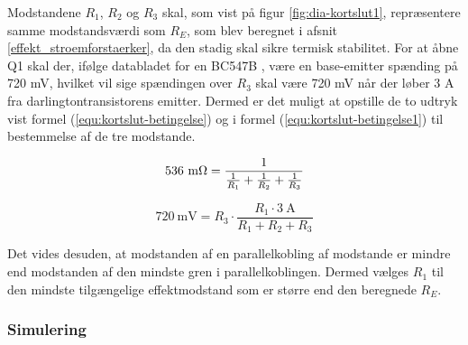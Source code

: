 Modstandene $R_1$, $R_2$ og $R_3$ skal, som vist på figur \ref{fig:dia-kortslut1}, repræsentere samme modstandsværdi som $R_E$, som blev beregnet i afsnit \ref{effekt_stroemforstaerker}, da den stadig skal sikre termisk stabilitet. For at åbne Q1 skal der, ifølge databladet for en BC547B , være en base-emitter spænding på 720 mV, hvilket vil sige spændingen over $R_3$ skal være 720 mV når der løber 3 A fra darlingtontransistorens emitter. Dermed er det muligt at opstille de to udtryk vist formel (\ref{equ:kortslut-betingelse}) og i formel (\ref{equ:kortslut-betingelse1}) til bestemmelse af de tre modstande.

\begin{equation}
\label{equ:kortslut-betingelse}
\mathrm{536~m\ohm} = \frac{1}{\frac{1}{R_1}+\frac{1}{R_2}+\frac{1}{R_3}}
\end{equation}

\begin{equation}
\label{equ:kortslut-betingelse1}
\mathrm{720~mV} = R_3 \cdot \frac{R_1 \cdot \mathrm{3~A}}{R_ 1+ R_2 + R_3}
\end{equation}

Det vides desuden, at modstanden af en parallelkobling af modstande er mindre end modstanden af den mindste gren i parallelkoblingen. Dermed vælges $R_1$ til den mindste tilgængelige effektmodstand som er større end den beregnede $R_E$. 

\subsubsection*{Simulering}